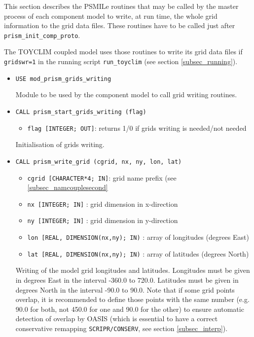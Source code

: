 This section describes the PSMILe routines that may be called by the
master process of each component model to write, at run time, the whole
grid information to the grid data files. These routines have to
be called just after {\tt prism\_init\_comp\_proto}.

The TOYCLIM coupled model 
uses those routines to write its grid data
files if \texttt{gridswr=1} in the running script
\texttt{run\_toyclim}  
(see section \ref{subsec_running}).


\begin{itemize}
\item {\tt USE  mod\_prism\_grids\_writing}

Module to be used by the component model to call grid writing routines.
  
\item {\tt CALL  prism\_start\_grids\_writing (flag)}
        
  \begin{itemize}
    \item {\tt flag [INTEGER; OUT]}:  returns 1/0 if grids writing is
    needed/not needed
  \end{itemize}
Initialisation of grids writing.

\item {\tt CALL prism\_write\_grid (cgrid, nx, ny, lon, lat)}
        
 \begin{itemize}
    \item {\tt cgrid [CHARACTER*4; IN]}: grid name prefix (see
    \ref{subsec_namcouplesecond}
    \item {\tt nx [INTEGER; IN]} : grid dimension in x-direction
    \item {\tt ny [INTEGER; IN]} : grid dimension in y-direction
    \item {\tt lon [REAL, DIMENSION(nx,ny); IN)} : array of longitudes
      (degrees East) 
    \item {\tt lat [REAL, DIMENSION(nx,ny); IN)} : array of latitudes
    (degrees North)
 \end{itemize}

 Writing of the model grid longitudes and latitudes. Longitudes must
 be given in degrees East in the interval -360.0 to 720.0. Latitudes
 must be given in degrees North in the interval -90.0 to 90.0. Note
 that if some grid points overlap, it is recommended to define those
 points with the same number (e.g. 90.0 for both, not 450.0 for one
 and 90.0 for the other) to ensure automatic detection of overlap by OASIS
 (which is essential to have a correct conservative remapping
 \texttt{SCRIPR/CONSERV}, see section \ref{subsec_interp}). 



\end{itemize}
